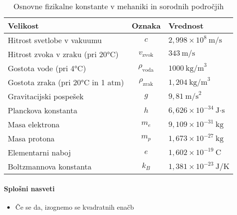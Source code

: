 \begin{table}[h!]
    \centering
    \begin{tabular}{|l|c|l|}
    \hline
    \textbf{Velikost} & \textbf{Oznaka} & \textbf{Vrednost} \\
    \hline
    Hitrost svetlobe v vakuumu & $c$ & $2{,}998 \times 10^8 \ \text{m/s}$ \\
    \hline
    Hitrost zvoka v zraku (pri 20°C) & $v_{\text{zvok}}$ & $343 \ \text{m/s}$ \\
    \hline
    Gostota vode (pri 4°C) & $\rho_{\text{voda}}$ & $1000 \ \text{kg/m}^3$ \\
    \hline
    Gostota zraka (pri 20°C in 1 atm) & $\rho_{\text{zrak}}$ & $1{,}204 \ \text{kg/m}^3$ \\
    \hline
    Gravitacijski pospešek & $g$ & $9{,}81 \ \text{m/s}^2$ \\
    \hline
    Planckova konstanta & $h$ & $6{,}626 \times 10^{-34} \ \text{J·s}$ \\
    \hline
    Masa elektrona & $m_e$ & $9{,}109 \times 10^{-31} \ \text{kg}$ \\
    \hline
    Masa protona & $m_p$ & $1{,}673 \times 10^{-27} \ \text{kg}$ \\
    \hline
    Elementarni naboj & $e$ & $1{,}602 \times 10^{-19} \ \text{C}$ \\
    \hline
    Boltzmannova konstanta & $k_B$ & $1{,}381 \times 10^{-23} \ \text{J/K}$ \\
    \hline
    \end{tabular}
    \caption{Osnovne fizikalne konstante v mehaniki in sorodnih področjih}
\end{table}
    

\paragraph{Splošni nasveti}
\begin{itemize}    
    \item Če se da, izognemo se kvadratnih enačb
\end{itemize}